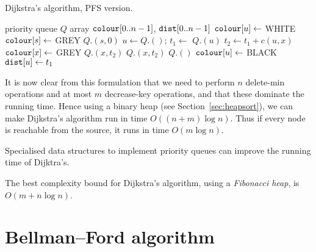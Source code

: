 \begin{algorithm}[H]
  \caption{Dijkstra's algorithm, PFS version.}
  \label{alg:dijkstra2}
\begin{algorithmic}[1]
	\State priority queue $Q$
	\State array $\colour[0..n-1]$, $\dist[0..n-1]$
		\State $\colour[u] \gets$ WHITE 
	\EndFor
	\State $\colour[s] \gets $ GREY
	\State $Q$.$(s, 0)$
		\State $u \gets Q$.$()$; $t_1 \gets$  $Q$.$(u)$
			\State $t_2 \gets t_1 + c(u, x)$
				\State $\colour[x] \gets $ GREY
				\State $Q$.$(x, t_2)$
				\State $Q$.$(x, t_2)$
			\EndIf
		\EndFor
		\State $Q$.$()$
		\State $\colour[u] \gets $ BLACK
		\State $\dist[u] \gets t_1$ 
	\EndWhile
	\State \Return{$\dist$}
\EndFunction
\end{algorithmic}
\end{algorithm}


It is now clear from this formulation that we need to perform $n$
delete-min operations and at most $m$ decrease-key operations, and
that these dominate the running time. Hence using a binary heap (see
Section~\ref{sec:heapsort}), we can make Dijkstra's
algorithm run in time $O((n + m) \log n)$. Thus if every node is reachable 
from the source, it runs in time $O(m\log n)$.


Specialised data structures to implement priority queues can improve the running time of Dijktra's.

The best complexity bound for Dijkstra's algorithm, using a \emph{Fibonacci heap},
is $O(m + n\log n)$.



\section{Bellman--Ford algorithm} \label{sec:bellford}

